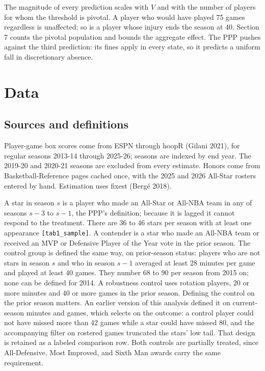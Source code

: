 \documentclass[11pt]{article}
\begin{document}
The magnitude of every prediction scales with $V$ and with the number of players for whom the threshold is pivotal. A player who would have played 75 games regardless is unaffected; so is a player whose injury ends the season at 40. Section 7 counts the pivotal population and bounds the aggregate effect. The PPP pushes against the third prediction: its fines apply in every state, so it predicts a uniform fall in discretionary absence.


\section{Data}



\subsection*{Sources and definitions}


Player-game box scores come from ESPN through hoopR (Gilani 2021), for regular seasons 2013-14 through 2025-26; seasons are indexed by end year. The 2019-20 and 2020-21 seasons are excluded from every estimate. Honors come from Basketball-Reference pages cached once, with the 2025 and 2026 All-Star rosters entered by hand. Estimation uses fixest (Bergé 2018).

A star in season $s$ is a player who made an All-Star or All-NBA team in any of seasons $s-3$ to $s-1$, the PPP's definition; because it is lagged it cannot respond to the treatment. There are 36 to 46 stars per season with at least one appearance {\small\texttt{[tab1\_sample]}}. A contender is a star who made an All-NBA team or received an MVP or Defensive Player of the Year vote in the prior season. The control group is defined the same way, on prior-season status: players who are not stars in season $s$ and who in season $s-1$ averaged at least 28 minutes per game and played at least 40 games. They number 68 to 90 per season from 2015 on; none can be defined for 2014. A robustness control uses rotation players, 20 or more minutes and 40 or more games in the prior season. Defining the control on the prior season matters. An earlier version of this analysis defined it on current-season minutes and games, which selects on the outcome: a control player could not have missed more than 42 games while a star could have missed 80, and the accompanying filter on rostered games truncated the stars' low tail. That design is retained as a labeled comparison row. Both controls are partially treated, since All-Defensive, Most Improved, and Sixth Man awards carry the same requirement.
\end{document}
